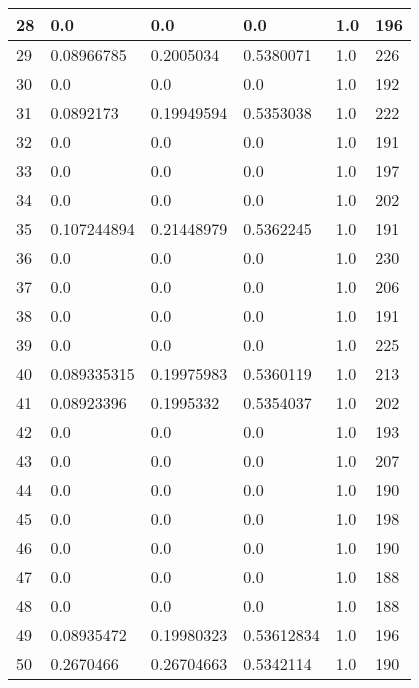 \begin{longtable}{|l|l|l|l|l|l|}
28 & 0.0 & 0.0 & 0.0 & 1.0 & 196 \\ \hline 
29 & 0.08966785 & 0.2005034 & 0.5380071 & 1.0 & 226 \\ \hline 
30 & 0.0 & 0.0 & 0.0 & 1.0 & 192 \\ \hline 
31 & 0.0892173 & 0.19949594 & 0.5353038 & 1.0 & 222 \\ \hline 
32 & 0.0 & 0.0 & 0.0 & 1.0 & 191 \\ \hline 
33 & 0.0 & 0.0 & 0.0 & 1.0 & 197 \\ \hline 
34 & 0.0 & 0.0 & 0.0 & 1.0 & 202 \\ \hline 
35 & 0.107244894 & 0.21448979 & 0.5362245 & 1.0 & 191 \\ \hline 
36 & 0.0 & 0.0 & 0.0 & 1.0 & 230 \\ \hline 
37 & 0.0 & 0.0 & 0.0 & 1.0 & 206 \\ \hline 
38 & 0.0 & 0.0 & 0.0 & 1.0 & 191 \\ \hline 
39 & 0.0 & 0.0 & 0.0 & 1.0 & 225 \\ \hline 
40 & 0.089335315 & 0.19975983 & 0.5360119 & 1.0 & 213 \\ \hline 
41 & 0.08923396 & 0.1995332 & 0.5354037 & 1.0 & 202 \\ \hline 
42 & 0.0 & 0.0 & 0.0 & 1.0 & 193 \\ \hline 
43 & 0.0 & 0.0 & 0.0 & 1.0 & 207 \\ \hline 
44 & 0.0 & 0.0 & 0.0 & 1.0 & 190 \\ \hline 
45 & 0.0 & 0.0 & 0.0 & 1.0 & 198 \\ \hline 
46 & 0.0 & 0.0 & 0.0 & 1.0 & 190 \\ \hline 
47 & 0.0 & 0.0 & 0.0 & 1.0 & 188 \\ \hline 
48 & 0.0 & 0.0 & 0.0 & 1.0 & 188 \\ \hline 
49 & 0.08935472 & 0.19980323 & 0.53612834 & 1.0 & 196 \\ \hline 
50 & 0.2670466 & 0.26704663 & 0.5342114 & 1.0 & 190 \\ \hline 
\end{longtable}